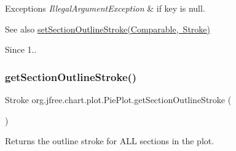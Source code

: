 \begin{DoxyExceptions}{Exceptions}
{\em Illegal\+Argument\+Exception} & if {\ttfamily key} is {\ttfamily null}.\\
\hline
\end{DoxyExceptions}
\begin{DoxySeeAlso}{See also}
\mbox{\hyperlink{classorg_1_1jfree_1_1chart_1_1plot_1_1_pie_plot_acd082f96925c46a66807857e4314b9ae}{set\+Section\+Outline\+Stroke(\+Comparable, Stroke)}}
\end{DoxySeeAlso}
\begin{DoxySince}{Since}
1.. 
\end{DoxySince}
\mbox{\label{classorg_1_1jfree_1_1chart_1_1plot_1_1_pie_plot_a60e2103a7ab26844fe2b655fc713128b}} 
\subsubsection{\texorpdfstring{get\+Section\+Outline\+Stroke()}{getSectionOutlineStroke()}\hspace{0.1cm}{\footnotesize\ttfamily [2/3]}}
{\footnotesize\ttfamily Stroke org.\+jfree.\+chart.\+plot.\+Pie\+Plot.\+get\+Section\+Outline\+Stroke (\begin{DoxyParamCaption}{ }\end{DoxyParamCaption})}

Returns the outline stroke for A\+LL sections in the plot.

